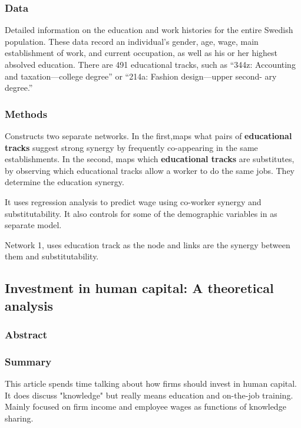 \documentclass[12pt]{article}
\begin{document}
\subsubsection*{Data}
Detailed information on the education and work histories for the entire Swedish population. These data record an individual’s gender, age, wage, main establishment of work, and current occupation, as well as his or her highest absolved education.  There are 491 educational tracks, such as “344z: Accounting and taxation—college degree” or “214a: Fashion design—upper second- ary degree.”

\subsubsection*{Methods}
Constructs two separate networks. In the first,maps what pairs of \textbf{educational tracks} suggest strong synergy by frequently co-appearing in the same establishments. In the second, maps which \textbf{educational tracks} are substitutes, by observing which educational tracks allow a worker to do the same jobs. They determine the education synergy.

It uses regression analysis to predict wage using co-worker synergy and substitutability. It also controls for some of the demographic variables in as separate model.

Network 1, uses education track as the node and links are the synergy between them and substitutability. 


\subsection*{Investment in human capital: A theoretical analysis\cite{investment_human_capital}}

\subsubsection*{Abstract}

\subsubsection*{Summary}

This article spends time talking about how firms should invest in human capital. It does discuss "knowledge" but really means education and on-the-job training. Mainly focused on firm income and employee wages as functions of knowledge sharing.
\end{document}
